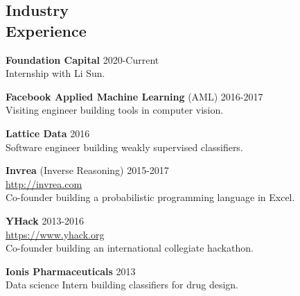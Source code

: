 \documentclass[margin, 10pt]{res} %
\begin{document}
\begin{resume}

\section{Industry \\ Experience}

\textbf{Foundation Capital} \hfill 2020-Current \\
Internship with Li Sun.

\textbf{Facebook Applied Machine Learning} (AML) \hfill 2016-2017 \\
Visiting engineer building tools in computer vision.

\textbf{Lattice Data} \hfill 2016 \\
Software engineer building weakly supervised classifiers.

\textbf{Invrea} (Inverse Reasoning) \hfill 2015-2017 \\
\url{http://invrea.com} \\
Co-founder building a probabilistic programming language in Excel.

\textbf{YHack} \hfill 2013-2016 \\
\url{https://www.yhack.org} \\
Co-founder building an international collegiate hackathon.

\textbf{Ionis Pharmaceuticals} \hfill 2013 \\
Data science Intern building classifiers for drug design.


\end{resume}
\end{document}
